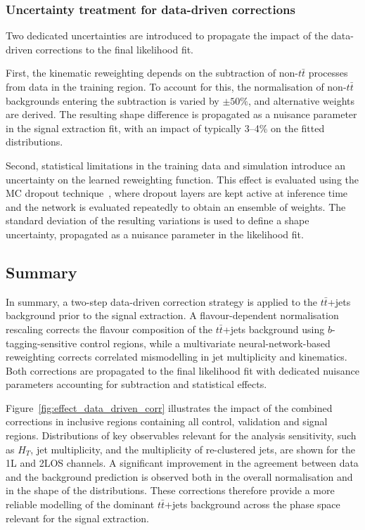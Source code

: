 \subsubsection{Uncertainty treatment for data-driven corrections}
\label{sec:NN_reweighting_unc_thesis}

Two dedicated uncertainties are introduced to propagate the impact of the data-driven corrections to the final likelihood fit.

First, the kinematic reweighting depends on the subtraction of non-$t\bar{t}$ processes from data in the training region.
To account for this, the normalisation of non-$t\bar{t}$ backgrounds entering the subtraction is varied by $\pm 50\%$, and alternative weights are derived.
The resulting shape difference is propagated as a nuisance parameter in the signal extraction fit, with an impact of typically 3--4\% on the fitted distributions.

Second, statistical limitations in the training data and simulation introduce an uncertainty on the learned reweighting function.
This effect is evaluated using the MC dropout technique~\cite{gal2016dropout}, where dropout layers are kept active at inference time and the network is evaluated repeatedly to obtain an ensemble of weights.
The standard deviation of the resulting variations is used to define a shape uncertainty, propagated as a nuisance parameter in the likelihood fit.

\subsection{Summary}
\label{sec:ttjets_modelling_summary}

In summary, a two-step data-driven correction strategy is applied to the $t\bar{t}$+jets background prior to the signal extraction.
A flavour-dependent normalisation rescaling corrects the flavour composition
of the $t\bar{t}$+jets background using $b$-tagging-sensitive control regions,
while a multivariate neural-network-based reweighting corrects correlated mismodelling in jet multiplicity and kinematics.
Both corrections are propagated to the final likelihood fit with dedicated nuisance parameters accounting for subtraction and statistical effects.

Figure~\ref{fig:effect_data_driven_corr} illustrates the impact of the combined corrections in inclusive regions containing all control, validation and signal regions.
Distributions of key observables relevant for the analysis sensitivity, such as $H_T$, jet multiplicity, and the multiplicity of re-clustered jets,
are shown for the 1L and 2LOS channels.
A significant improvement in the agreement between data and the background prediction is observed both in the overall normalisation and in the shape of the distributions.
These corrections therefore provide a more reliable modelling of the dominant $t\bar{t}$+jets background across the phase space relevant for the signal extraction.


